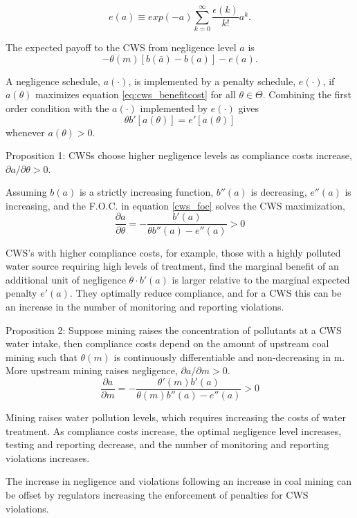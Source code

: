 \documentclass{article}
\begin{document}
\begin{equation}
    e(a)\equiv exp(-a)\sum^\infty_{k=0}\frac{\epsilon(k)}{k!}a^k.
\end{equation}

The expected payoff to the CWS from negligence level $a$ is
\begin{equation}\label{eq:cws_benefitcost}
    -\theta(m)[b(\bar{a})-b(a)]-e(a).
\end{equation}

A negligence schedule, $a(\cdot)$, is implemented by a penalty schedule, $e(\cdot)$, if $a(\theta)$ maximizes equation \ref{eq:cws_benefitcost} for all $\theta \in \Theta$. Combining the first order condition with the $a(\cdot)$ implemented by $e(\cdot)$ gives
\begin{equation}\label{cws_foc}
    \theta b'[a(\theta)]=e'[a(\theta)]
\end{equation}
whenever $a(\theta)>0$.

Proposition 1: CWSs choose higher negligence levels as compliance costs increase, $\partial a/ \partial \theta>0$.

Assuming $b(a)$ is a strictly increasing function, $b''(a)$ is decreasing, $e''(a)$ is increasing, and the F.O.C. in equation \ref{cws_foc} solves the CWS maximization,
\[\frac{\partial a}{\partial \theta}=-\frac{b'(a)}{\theta b''(a)-e''(a)}>0\]

CWS's with higher compliance costs, for example, those with a highly polluted water source requiring high levels of treatment, find the marginal benefit of an additional unit of negligence $\theta·b'(a)$ is larger relative to the marginal expected penalty $e'(a)$. They optimally reduce compliance, and for a CWS this can be an increase in the number of monitoring and reporting violations.

Proposition 2: Suppose mining raises the concentration of pollutants at a CWS water intake, then compliance costs depend on the amount of upstream coal mining such that $\theta (m)$ is continuously differentiable and non-decreasing in m. More upstream mining raises negligence, $\partial a/\partial m >0$.
\[\frac{\partial a}{\partial m}=-\frac{\theta'(m)b'(a)}{\theta(m) b''(a)-e''(a)}>0\]

Mining raises water pollution levels, which requires increasing the costs of water treatment. As compliance costs increase, the optimal negligence level increases, testing and reporting decrease, and the number of monitoring and reporting violations increases. 

The increase in negligence and violations following an increase in coal mining can be offset by regulators increasing the enforcement of penalties for CWS violations.
\end{document}
